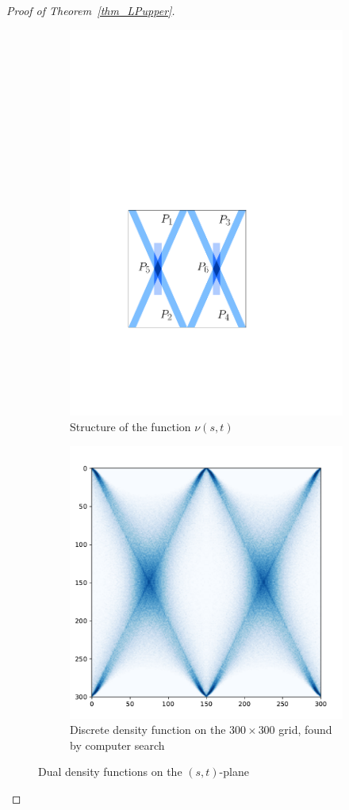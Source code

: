 \documentclass[11pt,a4paper]{amsart}
\begin{document}
\begin{proof}[Proof of Theorem~\ref{thm_LPupper}]
\begin{figure}
\centering
\begin{subfigure}{.5\textwidth}
  \centering
  \vspace{3 pt}
  \includegraphics[height=.675\linewidth]{Figures/chess6.pdf}
  \vspace{13 pt}
  \caption{Structure of the function $\nu(s,t)$ \\ \phantom{gh}}
  \label{fig6a}
\end{subfigure}%
\begin{subfigure}{.5\textwidth}
  \centering
  \includegraphics[height=.8\linewidth]{Figures/dualweight.pdf}
  \caption{Discrete density function on the $300 \times 300$ grid, found by computer search }
  \label{fig6b}
\end{subfigure}
\caption{Dual density functions on the $(s,t)$-plane}
\label{fig6}
\end{figure}




\end{proof}
\end{document}
